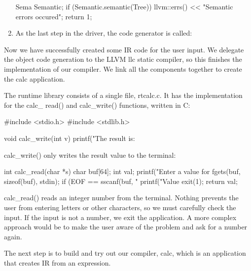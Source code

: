 \begin{enumerate}
\begin{cpp}
    Sema Semantic;
    if (Semantic.semantic(Tree)) {
        llvm::errs() << "Semantic errors occured\n";
        return 1;
    }
\end{cpp}

\item
As the last step in the driver, the code generator is called:

\begin{cpp}
    CodeGen CodeGenerator;
    CodeGenerator.compile(Tree);
    return 0;
}
\end{cpp}

\end{enumerate}

Now we have successfully created some IR code for the user input. We delegate the object code generation to the LLVM llc static compiler, so this finishes the implementation of our compiler. We link all the components together to create the calc application.

The runtime library consists of a single file, rtcalc.c. It has the implementation for the calc\_ read() and calc\_write() functions, written in C:

\begin{cpp}
#include <stdio.h>
#include <stdlib.h>

void calc_write(int v)
{
    printf("The result is: %
}
\end{cpp}

calc\_write() only writes the result value to the terminal:

\begin{cpp}
int calc_read(char *s)
{
    char buf[64];
    int val;
    printf("Enter a value for %
    fgets(buf, sizeof(buf), stdin);
    if (EOF == sscanf(buf, "%
    {
        printf("Value %
        exit(1);
    }
    return val;
}
\end{cpp}

calc\_read() reads an integer number from the terminal. Nothing prevents the user from entering letters or other characters, so we must carefully check the input. If the input is not a number, we exit the application. A more complex approach would be to make the user aware of the problem and ask for a number again.

The next step is to build and try out our compiler, calc, which is an application that creates IR from an expression.


